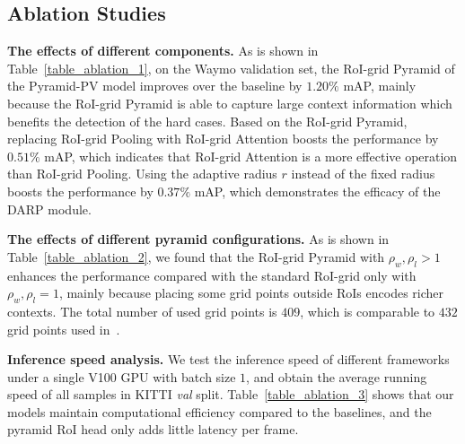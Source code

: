 \documentclass[10pt,twocolumn,letterpaper]{article}
\begin{document}
\subsection{Ablation Studies} \label{Ablation Studies}
\textbf{The effects of different components.} As is shown in Table~\ref{table_ablation_1}, on the Waymo validation set, the RoI-grid Pyramid of the Pyramid-PV model improves over the baseline by $1.20\%$ mAP, mainly because the RoI-grid Pyramid is able to capture large context information which benefits the detection of the hard cases. Based on the RoI-grid Pyramid, replacing RoI-grid Pooling with RoI-grid Attention boosts the performance by $0.51\%$ mAP, which indicates that RoI-grid Attention is a more effective operation than RoI-grid Pooling. Using the adaptive radius $r$ instead of the fixed radius boosts the performance by $0.37\%$ mAP, which demonstrates the efficacy of the DARP module. 

\textbf{The effects of different pyramid configurations.} As is shown in Table~\ref{table_ablation_2}, we found that the RoI-grid Pyramid with $\rho_{w}, \rho_{l}>1$ enhances the performance compared with the standard RoI-grid only with $\rho_{w}, \rho_{l}=1$, mainly because placing some grid points outside RoIs encodes richer contexts. The total number of used grid points is $409$, which is comparable to $432$ grid points used in~\cite{shi2020pv}.

\textbf{Inference speed analysis.} We test the inference speed of different frameworks under a single V100 GPU with batch size $1$, and obtain the average running speed of all samples in KITTI \textit{val} split. Table~\ref{table_ablation_3} shows that our models maintain computational efficiency compared to the baselines, and the pyramid RoI head only adds little latency per frame.

\begin{table}[]
\setlength{\belowcaptionskip}{10pt}
\caption{Effects of different components in Pyramid-PV on the Waymo dataset. R.P.: the RoI-grid Pyramid. D.A.R.P.: the Density-Aware Radius Prediction module. R.A.: RoI-grid Attention. $\star$: re-implemented by ourselves with the official code.} \label{table_ablation_1}
\vspace{-2mm}
\end{table}
\end{document}
